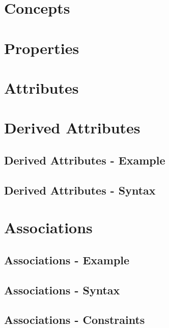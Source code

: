 \documentclass[a4paper,oneside,12pt, extrafontsizes]{memoir}
\theoremstyle{definition}
\theoremstyle{definition}
\theoremstyle{definition}
\theoremstyle{definition}
\begin{document}
\chapter{Concepts}
\label{ch:concepts}


\chapter{Properties}
\label{ch:properties}


\chapter{Attributes}
\label{ch:attributes}


\chapter{Derived Attributes}
\label{ch:derived-attributes}


\section{Derived Attributes - Example}


\section{Derived Attributes - Syntax}


\chapter{Associations}
\label{ch:associations}


\section{Associations - Example}


\section{Associations - Syntax}


\section{Associations - Constraints}

\end{document}
